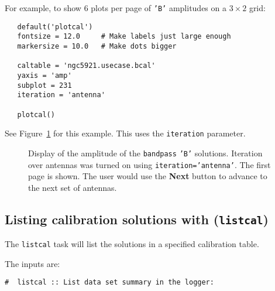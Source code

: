 {%

For example, to show 6 plots per page of {\tt 'B'} amplitudes on a 
$3 \times 2$ grid:
\small
\begin{verbatim}
   default('plotcal')
   fontsize = 12.0     # Make labels just large enough
   markersize = 10.0   # Make dots bigger

   caltable = 'ngc5921.usecase.bcal'
   yaxis = 'amp'
   subplot = 231
   iteration = 'antenna'

   plotcal()
\end{verbatim}
\normalsize
See Figure~\ref{fig:plotcal_B_5921_3x2} for this example.  This uses
the {\tt iteration} parameter.

\begin{figure}[h]
\begin{center}
\caption{\label{fig:plotcal_B_5921_3x2} Display of the amplitude
of the {\tt bandpass} {\tt 'B'} solutions.  Iteration over antennas
was turned on using {\tt iteration='antenna'}. The first page is shown.
The user would use the {\bf Next} button to advance to the next
set of antennas.} 
\hrulefill
\end{center}
\end{figure}


\subsection{Listing calibration solutions with ({\tt listcal})}
\label{section:cal.tables.listcal}

The {\tt listcal} task will list the solutions in a specified 
calibration table.

The inputs are:
\small
\begin{verbatim}
#  listcal :: List data set summary in the logger:


\end{verbatim}}
